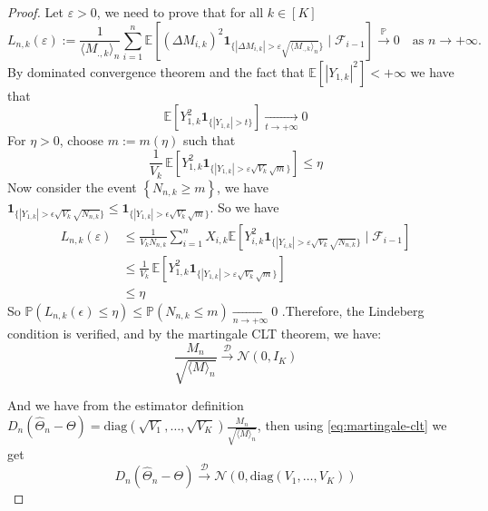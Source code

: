 \begin{proof}
	Let $\varepsilon > 0$, we need to prove that for all \(k \in [K]\)
	\begin{equation*}
		L_{n,k}(\varepsilon) 
		:= \frac{1}{\langle M_{.,k} \rangle_n} 
		\sum_{i=1}^n 
		\mathbb{E}\!\left[
		(\Delta M_{i,k})^2 
		\mathbf{1}_{\{|\Delta M_{i,k}| > \varepsilon \sqrt{\langle M_{.,k} \rangle_n}\}}
		\mid \mathcal{F}_{i-1}
		\right]
		\overset{\mathbb{P}}{\longrightarrow} 0 
		\quad \text{as } n \to +\infty.
	\end{equation*}
	By dominated convergence theorem and the fact that $\mathbb{E}\!\left[ |Y_{1,k}|^{2} \right] < +\infty$ we have that 
	\[\mathbb{E}\!\left[Y_{1,k}^2  \mathbf{1}_{\{|Y_{1,k}| > t\}}
	\right] \underset{t \to +\infty}{\longrightarrow} 0\]
	For \(\eta > 0\), choose \(m := m(\eta)\) such that 
	\[
	\frac{1}{V_k}
	\, \mathbb{E}\!\left[
	Y_{1,k}^2 
	\mathbf{1}_{\{|Y_{1,k}| > \varepsilon \sqrt{V_k} \sqrt{m}\}}
	\right] \leq \eta
	\]
	Now consider the event \(\left\{N_{n,k} \geq m\right\}\), we 
	have \(\mathbf{1}_{\{|Y_{1,k}| > \epsilon \sqrt{V_k} \sqrt{N_{n,k}}\}} \leq \mathbf{1}_{\{|Y_{1,k}| > \epsilon \sqrt{V_k} \sqrt{m}\}}\). So we have 	
	\begin{align*}
		L_{n,k}(\varepsilon)
		&\le 
		\frac{1}{V_k N_{n,k}} 
		\sum_{i=1}^n 
		X_{i,k} 
		\mathbb{E}\!\left[
		Y_{i,k}^2 
		\mathbf{1}_{\{|Y_{i,k}| > \varepsilon \sqrt{V_k} \sqrt{N_{n,k}}\}}
		\mid \mathcal{F}_{i-1}
		\right] \\
		&\leq 
		\frac{1}{V_k}
		\, \mathbb{E}\!\left[
		Y_{1,k}^2 
		\mathbf{1}_{\{|Y_{1,k}| > \varepsilon \sqrt{V_k} \sqrt{m}\}}
		\right] \\
		&\leq \eta
	\end{align*}
	So \(\mathbb{P}\left(L_{n,k}(\epsilon) \leq \eta\right) \leq \mathbb{P}\left(N_{n,k} \leq m\right) \underset{n \to +\infty}{\longrightarrow} 0\)	
	.Therefore, the Lindeberg condition is verified, and by the martingale CLT theorem, we have:
	\begin{equation}\label{eq:martingale-clt}
		\frac{M_n}{\sqrt{\langle M \rangle_n}} 
		\overset{\mathcal{D}}{\longrightarrow} 
		\mathcal{N}(0,I_K)
	\end{equation}
	
	And we have from the estimator definition \(D_n\left(\hat{\Theta}_n - \Theta\right) = \mathrm{diag}\left(\sqrt{V_1}, \ldots, \sqrt{V_K}\right)\frac{M_n}{\sqrt{\langle M \rangle_n}}\), then using \eqref{eq:martingale-clt} we get
	\begin{equation*}
		D_n\left(\hat{\Theta}_n - \Theta\right)
		\overset{\mathcal{D}}{\longrightarrow} 
		\mathcal{N}\left(0,\mathrm{diag}\left(V_1, \ldots, V_K\right)\right)
	\end{equation*}
\end{proof}


